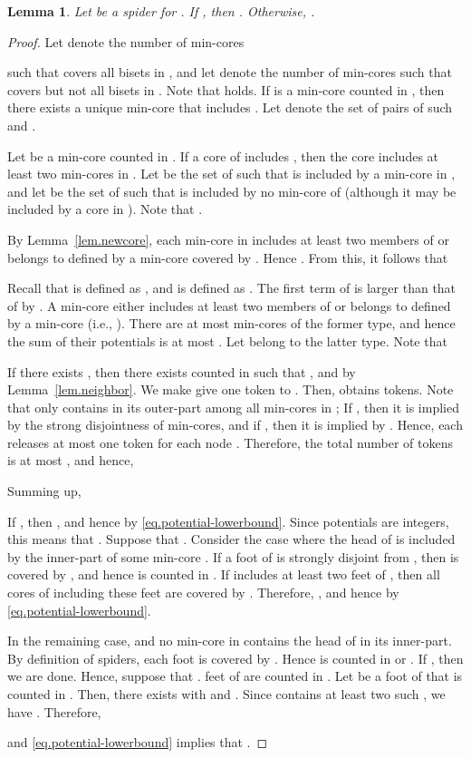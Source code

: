 \documentclass[11pt]{article}
\newtheorem{lemma}{Lemma}
\begin{document}
\begin{lemma}\label{lem.potentialdecrease}
 Let  be a spider for . If , then 
 .
 Otherwise, .
\end{lemma}
\begin{proof}
 Let  denote the number of min-cores
 
 such that  covers all bisets in , and let  denote the
 number of min-cores  
 such that  covers  but not all bisets in .
 Note that  holds.
 If  is a min-core counted in ,
 then there exists a unique min-core  that
 includes . Let  denote the set of pairs of such  and .

 Let  be a min-core counted in .
 If a core of  includes , then
 the core includes at least two min-cores in .
 Let  be the set of such  that
 is included by a min-core in , 
 and let  be the set of such 
 that 
 is included by no min-core of  (although it may be included by a core in ).
 Note that .

 By Lemma~\ref{lem.newcore},
 each min-core in   
 includes at least two members of  
 or belongs to  defined by a min-core 
  covered by .
 Hence
 .
 From this, it follows that 
 
 
 Recall that
  is defined as ,
 and 
  is defined as 
 .
 The first term of 
 is larger than that of  by .
 A min-core  either includes at least two members of
  or belongs to  defined by a
 min-core  (i.e., ).
 There are at most  min-cores of the former type, and hence
 the sum of their potentials is at most .
 Let  belong to the latter type. 
 Note that
 
 If there exists ,
 then there exists  counted in  such that , and  by Lemma~\ref{lem.neighbor}. 
 We make  give one token to .
 Then,  obtains  tokens. 
 Note that only  contains  in its
 outer-part among all min-cores in ;
 If , then
 it is implied by the strong disjointness of min-cores, and 
 if , then it is implied by .
 Hence, each  releases at most
 one token for each node .
Therefore, the total number of tokens is at most , and
hence,

 Summing up, 



 If , then , and hence  by \eqref{eq.potential-lowerbound}. Since potentials are integers, this means that 
 .
 Suppose that . 
  Consider the case where the head of  is included by the inner-part
 of some min-core .
 If a foot  of  is strongly disjoint from , 
 then  is covered by , and hence  is counted in .
 If  includes at least two feet of , then all cores of 
 including these feet are covered by . Therefore,
 , and hence
  by \eqref{eq.potential-lowerbound}.

 In the remaining case,  and 
 no min-core in  contains
the head  of  in its inner-part.
By definition of spiders, each foot  is covered by .
 Hence  is counted in  or .
 If , then we are done. Hence, suppose that
 .  feet of  are counted in .
 Let  be a foot of  that is counted in .
 Then, there exists  with
  and .
 Since  contains at least two such ,
 we have .
 Therefore,

 and \eqref{eq.potential-lowerbound} implies that
 .
 \end{proof}
\end{document}
